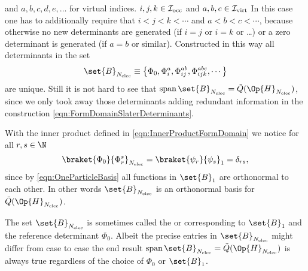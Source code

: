 \begin{rem}
{		and $a,b,c,d,e, \ldots$ for virtual indices.
	} $i,j,k \in \mathcal{I}_\text{occ}$ and $a,b,c \in \mathcal{I}_\text{virt}$
	In this case one has to additionally
	require that $i < j < k < \cdots$ and $a < b < c < \cdots$,
	because otherwise no new determinants are generated (if $i=j$ or $i=k$ or \ldots)
	or a zero determinant is generated (if $a=b$ or similar).
	Constructed in this way all determinants in the set
	\[
		\set{B}_{\Nelec} \equiv
		\left\{
			\Phi_0, \Phi_i^a, \Phi_{ij}^{ab}, \Phi_{ijk}^{abc}, \cdots \right\}
	\]
	are unique.
	Still it is not hard to see
	that $\spacespan \set{B}_{\Nelec} = \tilde{Q}(\Op{H}_{\Nelec})$,
	since we only took away those determinants adding redundant information
	in the construction \eqref{eqn:FormDomainSlaterDeterminants}.

	With the inner product defined in \eqref{eqn:InnerProductFormDomain} we notice
	for all $r,s \in \N$
	\[
		\braket{\Phi_0}{\Phi_r^s}_{\Nelec}
			= \braket{\psi_r}{\psi_s}_1 = \delta_{rs},
	\]
	since by \eqref{eqn:OneParticleBasis}
	all functions in $\set{B}_1$ are orthonormal to each other.
	In other words $\set{B}_{\Nelec}$ is an orthonormal
	basis for $\tilde{Q}(\Op{H}_{\Nelec})$.
\end{rem}
The set $\set{B}_{\Nelec}$ is sometimes called the 
or 
corresponding to $\set{B}_1$ and the reference determinant $\Phi_0$.
Albeit the precise entries in $\set{B}_{\Nelec}$ might differ from case to case
the end result $\spacespan \set{B}_{\Nelec} = \tilde{Q}(\Op{H}_{\Nelec})$
is always true
regardless of the choice of $\Phi_0$ or $\set{B}_1$.

